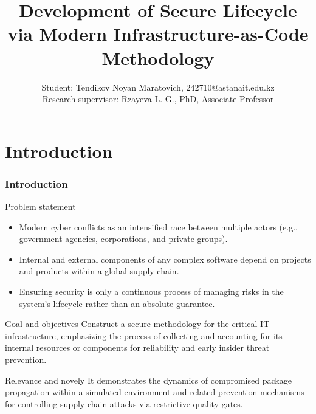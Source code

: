 \documentclass[9pt]{beamer}
\title{Development of Secure Lifecycle via Modern Infrastructure-as-Code Methodology}
\author{Student: Tendikov Noyan Maratovich, 242710@astanait.edu.kz \\ Research supervisor: Rzayeva L. G., PhD, Associate Professor}
\institute{Astana IT University, School of Cybersecurity, 2026}
\date{}
\begin{document}
\frame{\titlepage}

\section{Introduction}
\begin{frame}
\frametitle{Introduction}

\begin{block}{Problem statement}
\justifying
\begin{itemize}
    \item Modern cyber conflicts as an intensified race between multiple actors (e.g., government agencies, corporations, and private groups).
    \item Internal and external components of any complex software depend on projects and products within a global supply chain.
    \item Ensuring security is only a continuous process of managing risks in the system's lifecycle rather than an absolute guarantee.
\end{itemize}
\end{block}

\begin{block}{Goal and objectives}
\justifying
Construct a secure methodology for the critical IT infrastructure, emphasizing the process of collecting and accounting for its internal resources or components for reliability and early insider threat prevention.
\end{block}

\begin{block}{Relevance and novely}
\justifying
It demonstrates the dynamics of compromised package propagation within a simulated environment and related prevention mechanisms for controlling supply chain attacks via restrictive quality gates.
\end{block}

\end{frame}
\end{document}
